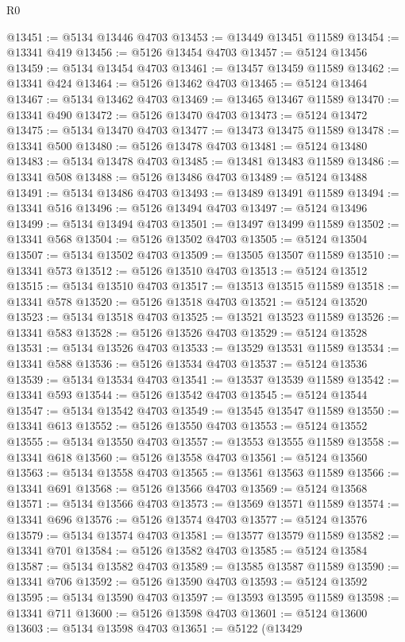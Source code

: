 \begin{lexlean}{R0}
\begin{coremodule}
@13451 := @5134 @13446 @4703
@13453 := @13449 @13451 @11589
@13454 := @13341 @419
@13456 := @5126 @13454 @4703
@13457 := @5124 @13456
@13459 := @5134 @13454 @4703
@13461 := @13457 @13459 @11589
@13462 := @13341 @424
@13464 := @5126 @13462 @4703
@13465 := @5124 @13464
@13467 := @5134 @13462 @4703
@13469 := @13465 @13467 @11589
@13470 := @13341 @490
@13472 := @5126 @13470 @4703
@13473 := @5124 @13472
@13475 := @5134 @13470 @4703
@13477 := @13473 @13475 @11589
@13478 := @13341 @500
@13480 := @5126 @13478 @4703
@13481 := @5124 @13480
@13483 := @5134 @13478 @4703
@13485 := @13481 @13483 @11589
@13486 := @13341 @508
@13488 := @5126 @13486 @4703
@13489 := @5124 @13488
@13491 := @5134 @13486 @4703
@13493 := @13489 @13491 @11589
@13494 := @13341 @516
@13496 := @5126 @13494 @4703
@13497 := @5124 @13496
@13499 := @5134 @13494 @4703
@13501 := @13497 @13499 @11589
@13502 := @13341 @568
@13504 := @5126 @13502 @4703
@13505 := @5124 @13504
@13507 := @5134 @13502 @4703
@13509 := @13505 @13507 @11589
@13510 := @13341 @573
@13512 := @5126 @13510 @4703
@13513 := @5124 @13512
@13515 := @5134 @13510 @4703
@13517 := @13513 @13515 @11589
@13518 := @13341 @578
@13520 := @5126 @13518 @4703
@13521 := @5124 @13520
@13523 := @5134 @13518 @4703
@13525 := @13521 @13523 @11589
@13526 := @13341 @583
@13528 := @5126 @13526 @4703
@13529 := @5124 @13528
@13531 := @5134 @13526 @4703
@13533 := @13529 @13531 @11589
@13534 := @13341 @588
@13536 := @5126 @13534 @4703
@13537 := @5124 @13536
@13539 := @5134 @13534 @4703
@13541 := @13537 @13539 @11589
@13542 := @13341 @593
@13544 := @5126 @13542 @4703
@13545 := @5124 @13544
@13547 := @5134 @13542 @4703
@13549 := @13545 @13547 @11589
@13550 := @13341 @613
@13552 := @5126 @13550 @4703
@13553 := @5124 @13552
@13555 := @5134 @13550 @4703
@13557 := @13553 @13555 @11589
@13558 := @13341 @618
@13560 := @5126 @13558 @4703
@13561 := @5124 @13560
@13563 := @5134 @13558 @4703
@13565 := @13561 @13563 @11589
@13566 := @13341 @691
@13568 := @5126 @13566 @4703
@13569 := @5124 @13568
@13571 := @5134 @13566 @4703
@13573 := @13569 @13571 @11589
@13574 := @13341 @696
@13576 := @5126 @13574 @4703
@13577 := @5124 @13576
@13579 := @5134 @13574 @4703
@13581 := @13577 @13579 @11589
@13582 := @13341 @701
@13584 := @5126 @13582 @4703
@13585 := @5124 @13584
@13587 := @5134 @13582 @4703
@13589 := @13585 @13587 @11589
@13590 := @13341 @706
@13592 := @5126 @13590 @4703
@13593 := @5124 @13592
@13595 := @5134 @13590 @4703
@13597 := @13593 @13595 @11589
@13598 := @13341 @711
@13600 := @5126 @13598 @4703
@13601 := @5124 @13600
@13603 := @5134 @13598 @4703
@13651 := @5122
    (@13429

\end{coremodule}
\end{lexlean}
